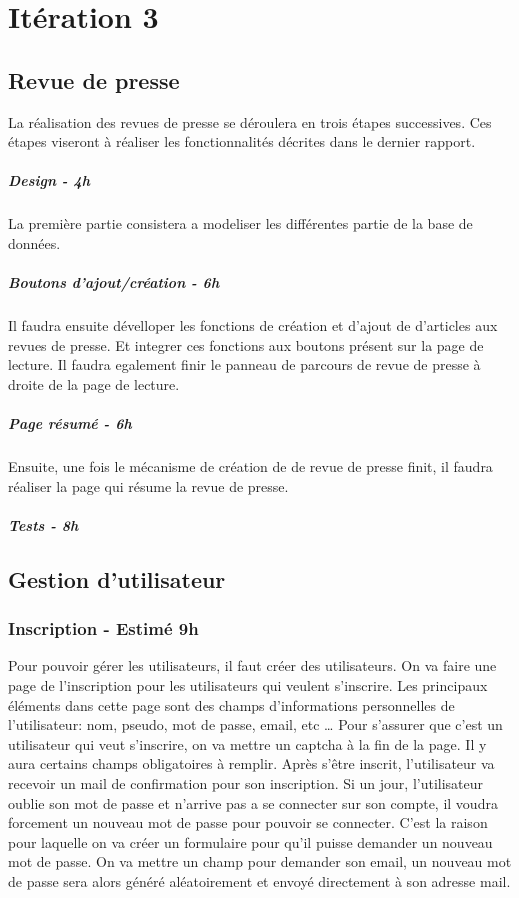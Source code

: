 \section{Itération 3}

	\subsection{Revue de presse}
		\label{sec:revue}

		La réalisation des revues de presse se déroulera en trois étapes successives.
		Ces étapes viseront à réaliser les fonctionnalités décrites dans le dernier rapport.

		\subparagraph{Design - 4h}
		\label{subpar:revue_design}
		La première partie consistera a modeliser les différentes partie de la base de données.

		\subparagraph{Boutons d'ajout/création - 6h}
		\label{subpar:revue_design}
		Il faudra ensuite dévelloper les fonctions de création et d'ajout de d'articles aux revues de presse.
		Et integrer ces fonctions aux boutons présent sur la page de lecture.
		Il faudra egalement finir le panneau de parcours de revue de presse à droite de la page de lecture.

		\subparagraph{Page résumé - 6h}
		\label{subpar:revue_resume}
		Ensuite, une fois le mécanisme de création de de revue de presse finit, il faudra réaliser la page qui résume
		la revue de presse.

		\subparagraph{Tests - 8h}
		\label{subpar:revue_tests}

	\subsection{Gestion d'utilisateur}
		\subsubsection{Inscription - Estimé 9h}
		Pour pouvoir gérer les utilisateurs, il faut créer des utilisateurs. On va faire une page de l’inscription pour les utilisateurs qui veulent s’inscrire. Les principaux éléments dans cette page sont des champs d’informations personnelles de l’utilisateur: nom, pseudo, mot de passe, email, etc … Pour s'assurer que c’est un utilisateur qui veut s’inscrire, on va mettre un captcha à la fin de la page. Il y aura certains champs obligatoires à remplir. Après s’être inscrit, l’utilisateur va recevoir un mail de confirmation pour son inscription.
		Si un jour, l’utilisateur oublie son mot de passe et n’arrive pas a se connecter sur son compte, il voudra forcement un nouveau mot de passe pour pouvoir se connecter. C’est la raison pour laquelle on va créer un formulaire pour qu’il puisse demander un nouveau mot de passe. On va mettre un champ pour demander son email, un nouveau mot de passe sera alors généré aléatoirement et envoyé directement à son adresse mail. 



